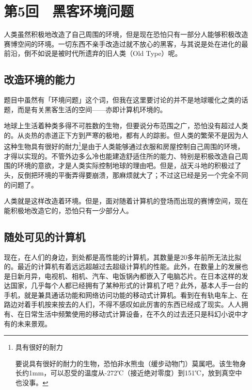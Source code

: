 \documentclass[a4paper,12pt]{article}
\begin{document}

\section{第5回　黑客环境问题}

人类虽然积极地改造了自己周围的环境，但是现在恐怕只有一部分人能够积极改造赛博空间的环境。一切东西不亲手改造过就不放心的黑客，与其说是处在进化的最前沿，倒不如说是被时代所遗弃的旧人类（Old Type）呢。

\subsection{改造环境的能力}

题目中虽然有「环境问题」这个词，但我在这里要讨论的并不是地球暖化之类的话题，而是有关黑客生活的空间——亦即计算机环境的。

地球上生活着种类多得不可胜数的生物，但要说分布范围之广，恐怕没有超过人类的。从炎热的赤道正下方到严寒的极地，都有人的踪影。但人类的繁荣不是因为人这种生物具有很好的耐力\footnote{具有很好的耐力

要说具有很好的耐力的生物，恐怕非水熊虫（缓步动物门）莫属吧。该生物身长约1mm，可以忍受的温度从-272℃（接近绝对零度）到151℃，放到真空中也没事。}是由于人类能够通过衣服和房屋控制自己周围的环境，才得以实现的。不管外边多么冷也能建造舒适住所的能力、特别是积极改造自己周围的环境的意欲，才是人类实际控制地球的理由吧。但是，战天斗地的积极过了头，反倒把环境的平衡弄得要崩溃，那麻烦就大了；不过这已经是另一个完全不同的问题了。

人类就是这样改造着环境。但是，面对随着计算机的登场而出现的赛博空间，现在能积极地改造它的，恐怕只有一少部分人。

\subsection{随处可见的计算机}

现在，在人们的身边，到处都是高性能的计算机，其数量是20多年前所无法比拟的。最近的计算机有着远远超越过去超级计算机的性能。此外，在数量上的发展也是日新月异，电视机、相机、汽车、电饭锅內都嵌入了电脑芯片。在日本这样的发达国家，几乎每个人都已经拥有了某种形式的计算机了吧？此外，基本人手一台的手机，就是兼具通话功能和网络访问功能的移动式计算机。看到在有轨电车上、在路边对着手机按来按去的人们，不得不感叹如此厉害的东西已经成了现实。人人拥有、在日常生活中频繁使用的移动式计算设备，在不久的过去还只是科幻小说中才有的未来景观。
\end{document}
